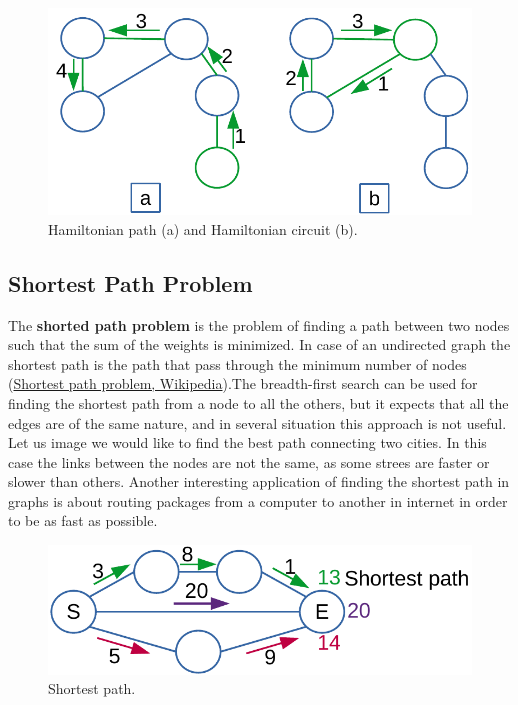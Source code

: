 \begin{figure}[H]
	\begin{center}
		\includegraphics[scale=.6]{chapters/graphs/images/graphs_10.pdf}
		\caption[Hamiltonian path (a) and Hamiltonian circuit (b).]{Hamiltonian path (a) and Hamiltonian circuit (b).}
		\label{graphs_10}
	\end{center}
\end{figure}

\subsection{Shortest Path Problem}
The \textbf{shorted path problem} is the problem of finding a path between two nodes such that the sum of the weights is minimized. In case of an undirected graph the shortest path is the path that pass through the minimum number of nodes \cite{wikishortestpath} (\href{https://en.wikipedia.org/wiki/Shortest_path_problem}{Shortest path problem, Wikipedia}).The breadth-first search can be used for finding the shortest path from a node to all the others, but it expects that all the edges are of the same nature, and in several situation this approach is not useful. Let us image we would like to find the best path connecting two cities. In this case the links between the nodes are not the same, as some strees are faster or slower than others. Another interesting application of finding the shortest path in graphs is about routing packages from a computer to another in internet in order to be as fast as possible.

\begin{figure}[H]
	\begin{center}
		\includegraphics[scale=.6]{chapters/graphs/images/graphs_11.pdf}
		\caption[Shortest path.]{Shortest path.}
		\label{graphs_11}
	\end{center}
\end{figure}

